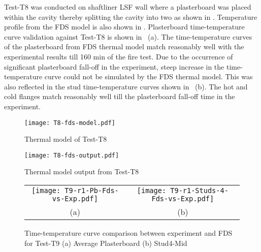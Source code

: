 Test-T8 was conducted on shaftliner LSF wall where a plasterboard was placed within the cavity thereby splitting the cavity into two as shown in . Temperature profile from the FDS model is also shown in . Plasterboard time-temperature curve validation against Test-T8 is shown in ~(a). The time-temperature curves of the plasterboard from FDS thermal model match reasonably well with the experimental results till 160 min of the fire test. Due to the occurrence of significant plasterboard fall-off in the experiment, steep increase in the time-temperature curve could not be simulated by the FDS thermal model. This was also reflected in the stud time-temperature curves shown in ~(b). The hot and cold flanges match reasonably well till the plasterboard fall-off time in the experiment.
\begin{figure}[htbp]
	\centering
		\texttt{[image: T8-fds-model.pdf]}
		\caption{Thermal model of Test-T8}
		\label{fig:T8-fds-model}
\end{figure}
\begin{figure}[htbp]
	\centering
		\texttt{[image: T8-fds-output.pdf]}
		\caption{Thermal model output from Test-T8}
		\label{fig:T8-fds-output}
\end{figure}
\begin{figure}[htbp]
	\centering
		\begin{tabular}{cc}
			\texttt{[image: T9-r1-Pb-Fds-vs-Exp.pdf]} & \texttt{[image: T9-r1-Studs-4-Fds-vs-Exp.pdf]} \\
			(a) & (b) \\
		\end{tabular} 
		\caption{Time-temperature curve comparison between experiment and FDS for Test-T9 (a) Average Plasterboard (b) Stud4-Mid}
		\label{fig:fds-output-pb-studs-t9}
\end{figure}

